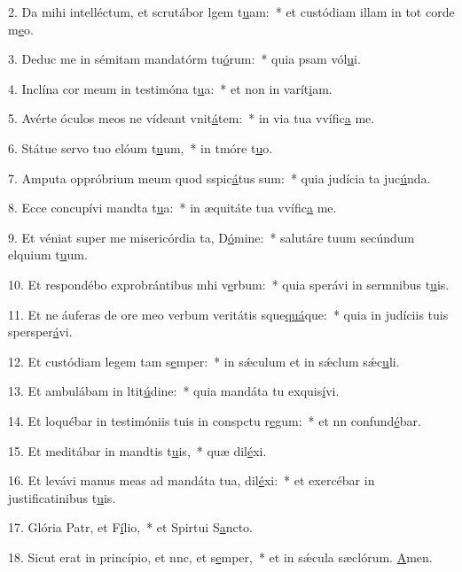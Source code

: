 2. Da mihi intelléctum, et scrutábor lgem t\uline{u}am:~* et custódiam illam in tot corde m\uline{e}o.\par 
3. Deduc me in sémitam mandatórm tu\uline{ó}rum:~* quia psam vól\uline{u}i.\par 
4. Inclína cor meum in testimóna t\uline{u}a:~* et non in varít\uline{i}am.\par 
5. Avérte óculos meos ne vídeant vnit\uline{á}tem:~* in via tua vvífic\uline{a} me.\par 
6. Státue servo tuo elóum t\uline{u}um,~* in tmóre t\uline{u}o.\par 
7. Amputa oppróbrium meum quod sspic\uline{á}tus sum:~* quia judícia ta juc\uline{ú}nda.\par 
8. Ecce concupívi mandta t\uline{u}a:~* in æquitáte tua vvífic\uline{a} me.\par 
9. Et véniat super me misericórdia ta, D\uline{ó}mine:~* salutáre tuum secúndum elquium t\uline{u}um.\par 
10. Et respondébo exprobrántibus mhi v\uline{e}rbum:~* quia sperávi in sermnibus t\uline{u}is.\par 
11. Et ne áuferas de ore meo verbum veritátis sque\uline{quá}que:~* quia in judíciis tuis spersper\uline{á}vi.\par 
12. Et custódiam legem tam s\uline{e}mper:~* in sǽculum et in sǽclum sǽc\uline{u}li.\par 
13. Et ambulábam in ltit\uline{ú}dine:~* quia mandáta tu exquis\uline{í}vi.\par 
14. Et loquébar in testimóniis tuis in conspctu r\uline{e}gum:~* et nn confund\uline{é}bar.\par 
15. Et meditábar in mandtis t\uline{u}is,~* quæ dil\uline{é}xi.\par 
16. Et levávi manus meas ad mandáta tua,  dil\uline{é}xi:~* et exercébar in justificatinibus t\uline{u}is.\par 
17. Glória Patr, et F\uline{í}lio,~* et Spirtui S\uline{a}ncto.\par 
18. Sicut erat in princípio, et nnc, et s\uline{e}mper,~* et in sǽcula sæclórum. \uline{A}men.\par 
